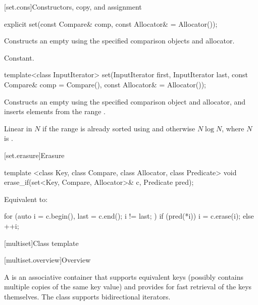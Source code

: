 [set.cons]{Constructors, copy, and assignment}

%
\begin{itemdecl}
explicit set(const Compare& comp, const Allocator& = Allocator());
\end{itemdecl}

\begin{itemdescr}
\pnum
\effects
Constructs an empty  using the specified comparison objects and allocator.

\pnum
\complexity
Constant.
\end{itemdescr}

%
\begin{itemdecl}
template<class InputIterator>
  set(InputIterator first, InputIterator last,
      const Compare& comp = Compare(), const Allocator& = Allocator());
\end{itemdecl}

\begin{itemdescr}
\pnum
\effects
Constructs an empty
using the specified comparison object and allocator,
and inserts elements from the range
.

\pnum
\complexity
Linear in $N$ if the range
is already sorted using 
and otherwise $N \log N$,
where $N$ is
.
\end{itemdescr}

[set.erasure]{Erasure}

%
\begin{itemdecl}
template <class Key, class Compare, class Allocator, class Predicate>
  void erase_if(set<Key, Compare, Allocator>& c, Predicate pred);
\end{itemdecl}

\begin{itemdescr}
\pnum
\effects
Equivalent to:
\begin{codeblock}
for (auto i = c.begin(), last = c.end(); i != last; ) {
  if (pred(*i)) {
    i = c.erase(i);
  } else {
    ++i;
  }
}
\end{codeblock}
\end{itemdescr}

[multiset]{Class template }

[multiset.overview]{Overview}

\pnum
{}%
A
is an associative container that supports equivalent keys (possibly contains multiple copies of
the same key value) and provides for fast retrieval of the keys themselves.
The
 class
supports bidirectional iterators.

